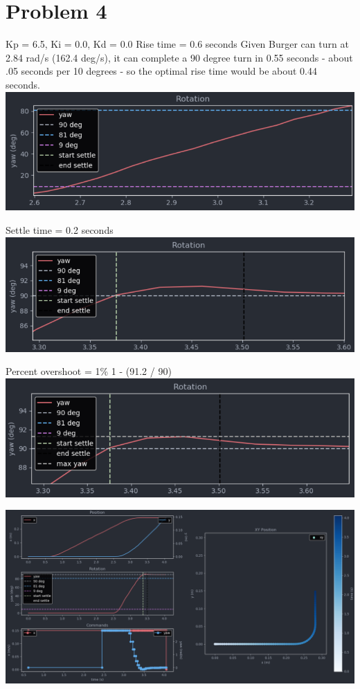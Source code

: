 \documentclass{article}
\begin{document}
    \section*{Problem 4}
        \raggedright
        Kp = 6.5, Ki = 0.0, Kd = 0.0 \break
        Rise time = 0.6 seconds \break
        Given Burger can turn at 2.84 rad/s (162.4 deg/s), it can complete a 90 degree turn in 0.55 seconds - about .05 seconds per 10 degrees - so the optimal rise time would be about 0.44 seconds.
        \includegraphics[width=\linewidth]{Problem 4 Rise Time.png} \break
        \begin{minipage}{\linewidth}
            \raggedright
            Settle time = 0.2 seconds \break
            \includegraphics[width=\linewidth]{Problem 4 Settle Time.png} \break
        \end{minipage}
        \begin{minipage}{\linewidth}
            \raggedright
            Percent overshoot = 1\% 1 - (91.2 / 90) \break
            \includegraphics[width=\linewidth]{Problem 4 Percent Overshoot.png} \break
        \end{minipage}
        \includegraphics[width=\linewidth]{Problem 4 Telemetry.png}
\end{document}
